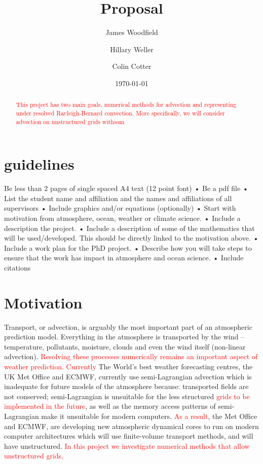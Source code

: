 \documentclass[a4paper,reqno]{elsarticle}
\numberwithin{equation}{section}
\numberwithin{figure}{section}
\newcommand{\cred}[1]{\textcolor{red}{#1}}
\begin{document}
\title{\textbf{Proposal}}
\date{\today}

\author[cdt]{James Woodfield}
\author[MET]{Hillary Weller}
\author[Lon]{Colin Cotter}
\address[cdt]{ EPSRC Centre for Doctoral Training in Mathematics of Planet Earth. 
University of Reading, UK; and Imperial College London, UK.}
\address[MET]{University of Reading, Reading, United Kingdom}
\address[Lon]{Imperial College London, United Kingdom}


\begin{frontmatter}

\begin{abstract}
\cred{This project has two main goals, numerical methods for advection and representing under resolved Rayleigh-Bernard convection. More specifically, we will consider advection on unstructured grids withsom  }
\end{abstract}
\end{frontmatter}
\section{guidelines}
Be less than 2 pages of single spaced A4 text (12 point font)
• Be a pdf file
• List the student name and affiliation and the names and affiliations of all supervisors
• Include graphics and/or equations (optionally)
• Start with motivation from atmosphere, ocean, weather or climate science.
• Include a description the project.
• Include a description of some of the mathematics that will be used/developed. This should be directly linked to the motivation above.
• Include a work plan for the PhD project.
• Describe how you will take steps to ensure that the work has impact in atmosphere and ocean science.
• Include citations
\section{Motivation}
Transport, or advection, is arguably the most important part of an atmospheric prediction model.
Everything in the atmosphere is transported by the wind – temperature, pollutants, moisture, clouds
and even the wind itself (non-linear advection). \cred{Resolving these processes numerically remains an important aspect of weather prediction.} \cred{Currently} The World’s best weather forecasting centres, the UK Met Office and ECMWF, currently use semi-Lagrangian advection which is inadequate for future
models of the atmosphere because: transported fields are not conserved; semi-Lagrangian is unsuitable for the less structured \cred{grids to be implemented in the future}, as well as the memory access patterns of semi-Lagrangian make it unsuitable for modern computers. \cred{As a result}, 
the Met Office and ECMWF, are developing new atmospheric dynamical cores to run on modern computer architectures which will use finite-volume transport methods, and will have unstructured. \cred{In this project we investigate numerical methods that allow unstructured grids,}
\end{document}
